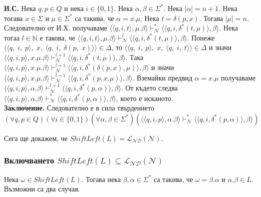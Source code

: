 \documentclass[12pt]{article}
\begin{document}
\textbf{И.С.}
Нека \(q, p \in Q\) и нека \(i \in \{0, 1\}\).
Нека \(\alpha, \beta \in \Sigma^*\). Нека \(|\alpha| = n + 1\).
Нека тогава \(x \in \Sigma\) и \(\mu \in \Sigma^*\) са такива, че
\(\alpha = x.\mu\). Нека \(t = \delta(p, x)\).  Тогава \(|\mu| = n\). Следователно от И.Х.
получаваме \(\langle \langle q, i, t \rangle, \mu.\beta \rangle \vdash_{\mathcal N}^* \langle \langle q, i, \delta^*(t, \mu) \rangle, \beta \rangle\). Нека тогаа \(l \in \mathbb N\) е такова, че
\(\langle \langle q, i, t \rangle, \mu.\beta \rangle \vdash_{\mathcal N}^l \langle \langle q, i, \delta^*(t, \mu) \rangle, \beta \rangle\). Понеже \( \langle \langle q,\; i,\; p \rangle,\; x,\; \langle q,\; i,\; \delta(p,\; x) \rangle \rangle \in \Delta \), то \( \langle \langle q,\; i,\; p \rangle,\; x,\; \langle q,\; i,\; t \rangle \rangle \in \Delta \) и значи \(\langle \langle q, i, p \rangle, x.\mu.\beta \rangle \vdash_{\mathcal N}^{l + 1} \langle \langle q, i, \delta^*(t, \mu) \rangle, \beta \rangle\). Така
\(\langle \langle q, i, p \rangle, x.\mu.\beta \rangle \vdash_{\mathcal N}^{l + 1} \langle \langle q, i, \delta^*(\delta(p, x), \mu) \rangle, \beta \rangle\) и значи \(\langle \langle q, i, p \rangle, x.\mu.\beta \rangle \vdash_{\mathcal N}^{l + 1} \langle \langle q, i, \delta^*(p, x.\mu) \rangle, \beta \rangle\).
Вземайки предвид \(\alpha = x.\mu\) получаваме \(\langle \langle q, i, p \rangle, \alpha.\beta \rangle \vdash_{\mathcal N}^{l + 1} \langle \langle q, i, \delta^*(p, \alpha) \rangle, \beta \rangle\).
От където следва \(\langle \langle q, i, p \rangle, \alpha.\beta \rangle \vdash_{\mathcal N}^* \langle \langle q, i, \delta^*(p, \alpha) \rangle, \beta \rangle\), което е исканото. \\

\textbf{Заключение.} Следователно е в сила твърдението
\[(\forall q, p \in Q)(\forall i \in \{0, 1\})(\forall \alpha, \beta \in \Sigma^*)
(\langle \langle q, i, p \rangle, \alpha.\beta \rangle \vdash_{\mathcal N}^* \langle \langle q, i, \delta^*(p, \alpha) \rangle, \beta \rangle )\]

Сега ще докажем, че \(ShiftLeft(L) = \mathcal{L_{ND}}(\mathcal N)\).

\subsubsection*{Включването \(ShiftLeft(L) \subseteq \mathcal{L_{ND}}(\mathcal N)\)}
Нека \(\omega \in ShiftLeft(L)\). Тогава нека \(\beta, \alpha \in \Sigma^*\) са такива, че
\(\omega = \beta.\alpha\) и \(\alpha.\beta \in L\). Възможни са два случая. \\
\end{document}
